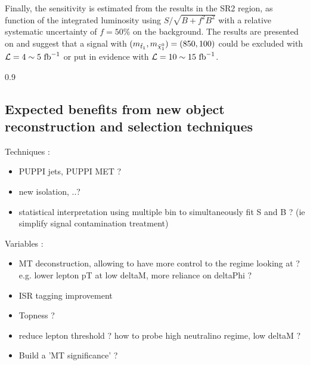         \begin{table}
            \centering
            
            \caption{ \label{tab:phys14SignalRegions}}
        \end{table}

       Finally, the sensitivity is estimated from the results in the SR2 region, as function
       of the integrated luminosity using $S / \sqrt{B + f^2 B^2}$ with a relative systematic
       uncertainty of $f = 50\%$ on the background. The results are presented on 
       and suggest that a signal with $(m_{\tilde{t}_1}, m_{\tilde{\chi}_1^0}) = (850,100)$
       could be excluded with $\mathcal{L} = 4\sim5~\text{fb}^{-1}$ or put in evidence with
       $\mathcal{L} = 10\sim15~\text{fb}^{-1}$.

                         {0.9}
                         {}

         \subsection{Expected benefits from new object reconstruction and selection techniques}

            Techniques :
            \begin{itemize}
                \item PUPPI jets, PUPPI MET ?
                \item new isolation, ..?
                \item statistical interpretation using multiple bin to simultaneously fit S and B ? (ie simplify signal contamination treatment)
            \end{itemize}

            Variables :
            \begin{itemize}
                \item MT deconstruction, allowing to have more control to the regime looking at ? e.g. lower lepton pT  at low deltaM, more reliance on deltaPhi ?
                \item ISR tagging improvement
                \item Topness ?
                \item reduce lepton threshold ? how to probe high neutralino regime, low deltaM ?
                \item Build a 'MT significance' ?
            \end{itemize}

